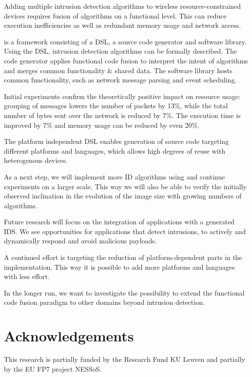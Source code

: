 \documentclass[conference]{IEEEtran}
\begin{document}
Adding multiple intrusion detection algorithms to wireless resource-constrained
devices requires fusion of algorithms on a functional level. This can reduce
execution inefficiencies as well as redundant memory usage and network access.

\NAME is a framework consisting of a DSL, a source code generator and software
library. Using the DSL, intrusion detection algorithms can be formally
described. The code generator applies functional code fusion to interpret the
intent of algorithms and merges common functionality \& shared data. The
software library hosts common functionality, such as network message parsing
and event scheduling.

Initial experiments confirm the theoretically positive impact on resource
usage: grouping of messages lowers the number of packets by 13\%, while the
total number of bytes sent over the network is reduced by 7\%. The execution
time is improved by 7\% and memory usage can be reduced by even 20\%.

The platform independent DSL enables generation of source code targeting
different platforms and languages, which allows high degrees of reuse with
heterogenous devices.

As a next step, we will implement more ID algorithms using \NAME and continue
experiments on a larger scale. This way we will also be able to verify the
initially observed inclination in the evolution of the image size with growing
numbers of algorithms.

Future research will focus on the integration of applications with a generated
IDS. We see opportunities for applications that detect intrusions, to actively
and dynamically respond and avoid malicious payloads.

A continued effort is targeting the reduction of platform-dependent parts in
the implementation. This way it is possible to add more platforms and languages
with less effort.

In the longer run, we want to investigate the possibility to extend the
functional code fusion paradigm to other domains beyond intrusion detection.

\section{Acknowledgements}

This research is partially funded by the Research Fund KU Leuven and partially
by the EU FP7 project NESSoS\@.



\end{document}
